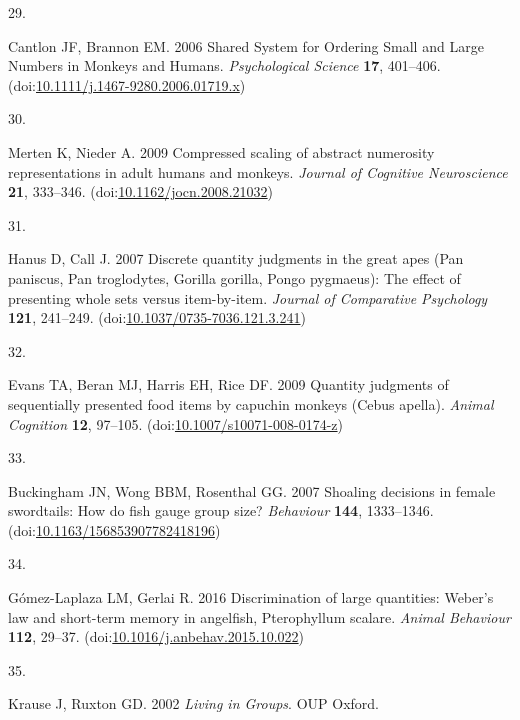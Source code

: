 \documentclass[
  ,pub,floatsintext]{apa6}
\newlength{\cslhangindent}
\newlength{\csllabelwidth}
\newlength{\cslentryspacingunit} %
\newenvironment{CSLReferences}[2] %
 {%
  \setlength{\parindent}{0pt}
  \ifodd #1
  \let\oldpar\par
  \def\par{\hangindent=\cslhangindent\oldpar}
  \fi
  \setlength{\parskip}{#2\cslentryspacingunit}
 }%
 {}
\newcommand{\CSLLeftMargin}[1]{\parbox[t]{\csllabelwidth}{#1}}
\newcommand{\CSLRightInline}[1]{\parbox[t]{\linewidth - \csllabelwidth}{#1}\break}
\begin{document}
\begin{CSLReferences}{0}{0}
\leavevmode{}%
\CSLLeftMargin{29. }%
\CSLRightInline{Cantlon JF, Brannon EM. 2006 Shared {System} for {Ordering} {Small} and {Large} {Numbers} in {Monkeys} and {Humans}. \emph{Psychological Science} \textbf{17}, 401--406. (doi:\href{https://doi.org/10.1111/j.1467-9280.2006.01719.x}{10.1111/j.1467-9280.2006.01719.x})}

\leavevmode{}%
\CSLLeftMargin{30. }%
\CSLRightInline{Merten K, Nieder A. 2009 Compressed scaling of abstract numerosity representations in adult humans and monkeys. \emph{Journal of Cognitive Neuroscience} \textbf{21}, 333--346. (doi:\href{https://doi.org/10.1162/jocn.2008.21032}{10.1162/jocn.2008.21032})}

\leavevmode{}%
\CSLLeftMargin{31. }%
\CSLRightInline{Hanus D, Call J. 2007 Discrete quantity judgments in the great apes ({Pan} paniscus, {Pan} troglodytes, {Gorilla} gorilla, {Pongo} pygmaeus): {The} effect of presenting whole sets versus item-by-item. \emph{Journal of Comparative Psychology} \textbf{121}, 241--249. (doi:\href{https://doi.org/10.1037/0735-7036.121.3.241}{10.1037/0735-7036.121.3.241})}

\leavevmode{}%
\CSLLeftMargin{32. }%
\CSLRightInline{Evans TA, Beran MJ, Harris EH, Rice DF. 2009 Quantity judgments of sequentially presented food items by capuchin monkeys ({Cebus} apella). \emph{Animal Cognition} \textbf{12}, 97--105. (doi:\href{https://doi.org/10.1007/s10071-008-0174-z}{10.1007/s10071-008-0174-z})}

\leavevmode{}%
\CSLLeftMargin{33. }%
\CSLRightInline{Buckingham JN, Wong BBM, Rosenthal GG. 2007 Shoaling decisions in female swordtails: {How} do fish gauge group size? \emph{Behaviour} \textbf{144}, 1333--1346. (doi:\href{https://doi.org/10.1163/156853907782418196}{10.1163/156853907782418196})}

\leavevmode{}%
\CSLLeftMargin{34. }%
\CSLRightInline{Gómez-Laplaza LM, Gerlai R. 2016 Discrimination of large quantities: {Weber}'s law and short-term memory in angelfish, {Pterophyllum} scalare. \emph{Animal Behaviour} \textbf{112}, 29--37. (doi:\href{https://doi.org/10.1016/j.anbehav.2015.10.022}{10.1016/j.anbehav.2015.10.022})}

\leavevmode{}%
\CSLLeftMargin{35. }%
\CSLRightInline{Krause J, Ruxton GD. 2002 \emph{Living in {Groups}}. OUP Oxford. }


\end{CSLReferences}
\end{document}
